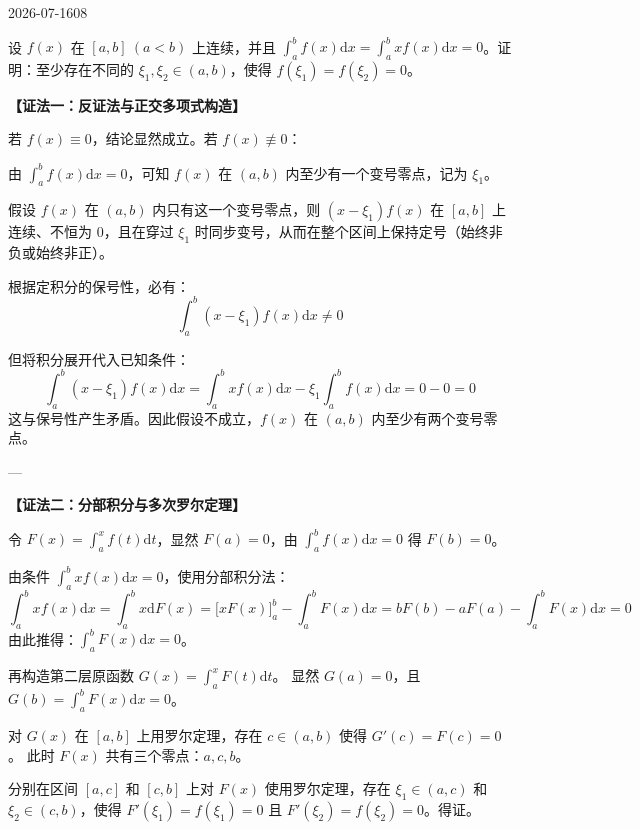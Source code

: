 \begin{mistake}{2026-07-16}{08}

\begin{problemcontent}
设 \(f(x)\) 在 \([a, b]\ (a < b)\) 上连续，并且 \(\int_a^b f(x) \mathrm{d}x = \int_a^b x f(x) \mathrm{d}x = 0\)。证明：至少存在不同的 \(\xi_1, \xi_2 \in (a, b)\)，使得 \(f(\xi_1) = f(\xi_2) = 0\)。
\end{problemcontent}

\begin{solutioncontent}
\textbf{【证法一：反证法与正交多项式构造】}

若 \(f(x) \equiv 0\)，结论显然成立。若 \(f(x) \not\equiv 0\)：

由 \(\int_a^b f(x)\mathrm{d}x = 0\)，可知 \(f(x)\) 在 \((a, b)\) 内至少有一个变号零点，记为 \(\xi_1\)。

假设 \(f(x)\) 在 \((a,b)\) 内只有这一个变号零点，则 \((x-\xi_1)f(x)\) 在 \([a,b]\) 上连续、不恒为 0，且在穿过 \(\xi_1\) 时同步变号，从而在整个区间上保持定号（始终非负或始终非正）。

根据定积分的保号性，必有：
\[ \int_a^b (x - \xi_1)f(x) \mathrm{d}x \neq 0 \]

但将积分展开代入已知条件：
\[ \int_a^b (x - \xi_1)f(x) \mathrm{d}x = \int_a^b x f(x) \mathrm{d}x - \xi_1 \int_a^b f(x) \mathrm{d}x = 0 - 0 = 0 \]
这与保号性产生矛盾。因此假设不成立，\(f(x)\) 在 \((a,b)\) 内至少有两个变号零点。

---

\textbf{【证法二：分部积分与多次罗尔定理】}

令 \(F(x) = \int_a^x f(t)\mathrm{d}t\)，显然 \(F(a) = 0\)，由 \(\int_a^b f(x)\mathrm{d}x = 0\) 得 \(F(b) = 0\)。

由条件 \(\int_a^b x f(x)\mathrm{d}x = 0\)，使用分部积分法：
\[ \int_a^b x f(x)\mathrm{d}x = \int_a^b x \mathrm{d}F(x) = \Big[ x F(x) \Big]_a^b - \int_a^b F(x)\mathrm{d}x = bF(b) - aF(a) - \int_a^b F(x)\mathrm{d}x = 0 \]
由此推得：\(\int_a^b F(x)\mathrm{d}x = 0\)。

再构造第二层原函数 \(G(x) = \int_a^x F(t)\mathrm{d}t\)。
显然 \(G(a) = 0\)，且 \(G(b) = \int_a^b F(x)\mathrm{d}x = 0\)。

对 \(G(x)\) 在 \([a,b]\) 上用罗尔定理，存在 \(c \in (a, b)\) 使得 \(G'(c) = F(c) = 0\)。
此时 \(F(x)\) 共有三个零点：\(a, c, b\)。

分别在区间 \([a,c]\) 和 \([c,b]\) 上对 \(F(x)\) 使用罗尔定理，存在 \(\xi_1 \in (a, c)\) 和 \(\xi_2 \in (c, b)\)，使得 \(F'(\xi_1)=f(\xi_1)=0\) 且 \(F'(\xi_2)=f(\xi_2)=0\)。得证。
\end{solutioncontent}


\end{mistake}
